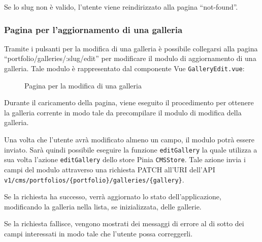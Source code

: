 Se lo slug non \`e valido, l'utente viene reindirizzato alla pagina ``not-found''.

\subsubsection{Pagina per l'aggiornamento di una galleria}
Tramite i pulsanti per la modifica di una galleria \`e possibile collegarsi alla pagina ``portfolio/galleries/:slug/edit'' per modificare il modulo di aggiornamento di una galleria. Tale modulo \`e rappresentato dal componente Vue \verb|GalleryEdit.vue|:

\begin{figure}[htbp]
	\centering
	\fboxsep=0.5pt
	\fboxrule=0.5pt
	\caption{Pagina per la modifica di una galleria}
	\label{fig:cms-g-update}
\end{figure}

Durante il caricamento della pagina, viene eseguito il procedimento per ottenere la galleria corrente in modo tale da precompilare il modulo di modifica della galleria.

Una volta che l'utente avr\`a modificato almeno un campo, il modulo potr\`a essere inviato. Sar\`a quindi possibile eseguire la funzione \verb|editGallery| la quale utilizza a sua volta l'azione \verb|editGallery| dello store Pinia \verb|CMSStore|. Tale azione invia i campi del modulo attraverso una richiesta PATCH all'URI dell'API \verb|v1/cms/portfolios/{portfolio}/galleries/{gallery}|.

Se la richiesta ha successo, verr\`a aggiornato lo stato dell'applicazione, modificando la galleria nella lista, se inizializzata, delle gallerie.

Se la richiesta fallisce, vengono mostrati dei messaggi di errore al di sotto dei campi interessati in modo tale che l'utente possa correggerli.

